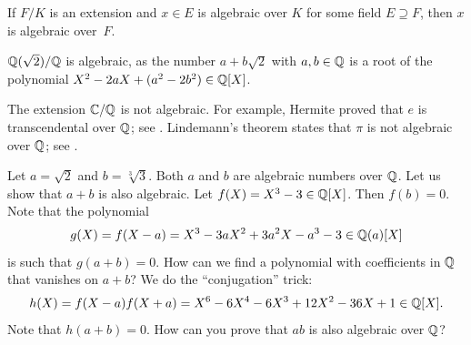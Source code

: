 If $F/K$ is an extension and $x\in E$ is algebraic
over $K$ for some field $E\supseteq F$, 
then $x$ is algebraic over~$F$. 

\begin{example}
	$\mathbb{Q}(\sqrt{2})/\mathbb{Q}$ is algebraic, as the number
	$a+b\sqrt{2}$ with $a,b\in\mathbb{Q}$ is a root of the polynomial
	$X^2-2aX+(a^2-2b^2)\in\mathbb{Q}[X]$. 
\end{example}

The extension $\mathbb{C}/\mathbb{Q}$ is not algebraic. For example, Hermite proved 
that $e$ is transcendental 
over $\mathbb{Q}$; see \cite[Theorem 24.4]{MR3379917}. Lindemann's theorem 
states that $\pi$ is 
not algebraic over $\mathbb{Q}$; see \cite[Theorem 24.5]{MR3379917}. 

\begin{example}
\label{exa:two_algebraics}
    Let $a=\sqrt{2}$ and $b=\sqrt[3]{3}$. Both $a$ and $b$ are algebraic numbers over $\mathbb{Q}$. 
    Let us show that $a+b$ is also algebraic. Let $f(X)=X^3-3\in\mathbb{Q}[X]$. Then $f(b)=0$. Note
    that the polynomial 
    \[
    g(X)=f(X-a)=X^3-3aX^2+3a^2X-a^3-3\in\mathbb{Q}(a)[X]
    \]
    is such that $g(a+b)=0$. How can we find a polynomial 
    with coefficients in $\mathbb{Q}$ that vanishes on $a+b$? We do the ``conjugation'' trick:
    \[
    h(X)=f(X-a)f(X+a)=X^6-6X^4-6X^3+12X^2-36X+1\in\mathbb{Q}[X].
    \]
    Note that $h(a+b)=0$. How can you prove that $ab$ is also algebraic over $\mathbb{Q}$?     
\end{example}

